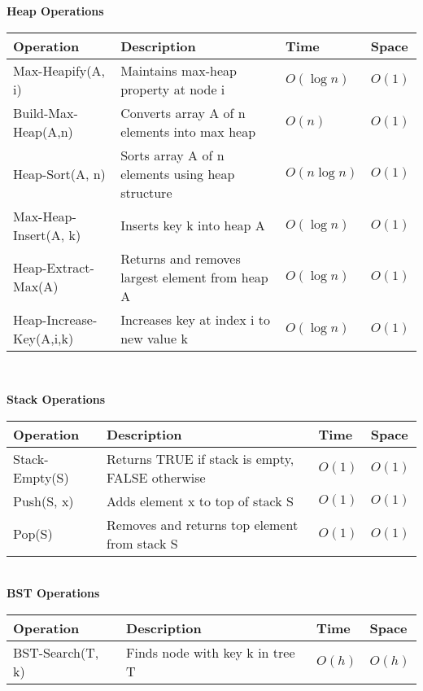 {{\begin{minipage}[t]{0.49\textwidth}
\textbf{Heap Operations}\\
\begin{tabular}{|p{}|p{}|p{}|p{}|}
\hline
\textbf{Operation} & \textbf{Description} & \textbf{Time} & \textbf{Space} \\
\hline
Max-Heapify(A, i) & Maintains max-heap property at node i & $O(\log n)$ & $O(1)$ \\
\hline
Build-Max-Heap(A,n) & Converts array A of n elements into max heap & $O(n)$ & $O(1)$ \\
\hline
Heap-Sort(A, n) & Sorts array A of n elements using heap structure & $O(n \log n)$ & $O(1)$ \\
\hline
Max-Heap-Insert(A, k) & Inserts key k into heap A & $O(\log n)$ & $O(1)$ \\
\hline
Heap-Extract-Max(A) & Returns and removes largest element from heap A & $O(\log n)$ & $O(1)$ \\
\hline
Heap-Increase-Key(A,i,k) & Increases key at index i to new value k & $O(\log n)$ & $O(1)$ \\
\hline
\end{tabular}\\
\end{minipage}
\hspace{-37px}
\begin{minipage}[t]{0.49\textwidth}
\textbf{Stack Operations}\\
\begin{tabular}{|p{}|p{}|p{}|p{}|}
\hline
\textbf{Operation} & \textbf{Description} & \textbf{Time} & \textbf{Space} \\
\hline
Stack-Empty(S) & Returns TRUE if stack is empty, FALSE otherwise & $O(1)$ & $O(1)$ \\
\hline
Push(S, x) & Adds element x to top of stack S & $O(1)$ & $O(1)$ \\
\hline
Pop(S) & Removes and returns top element from stack S & $O(1)$ & $O(1)$ \\
\hline
\end{tabular}\\
\textbf{BST Operations}\\
\begin{tabular}{|p{}|p{}|p{}|p{}|}
\hline
\textbf{Operation} & \textbf{Description} & \textbf{Time} & \textbf{Space} \\
\hline
BST-Search(T, k) & Finds node with key k in tree T & $O(h)$ & $O(h)$ \\

\end{tabular}
\end{minipage}}}
